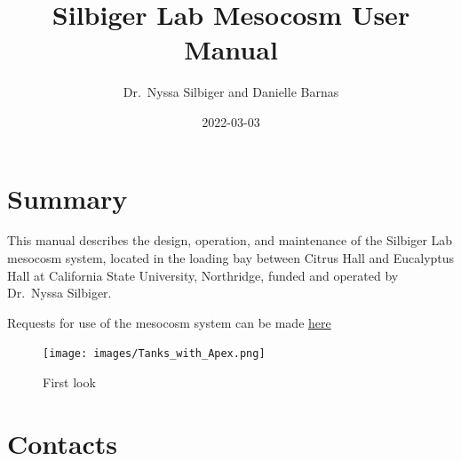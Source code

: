 \documentclass[
]{book}
\title{Silbiger Lab Mesocosm User Manual}
\author{Dr.~Nyssa Silbiger and Danielle Barnas}
\date{2022-03-03}
\begin{document}
\maketitle

{
\setcounter{tocdepth}{1}
\tableofcontents
}
\hypertarget{summary}{%
\chapter{Summary}\label{summary}}

This manual describes the design, operation, and maintenance of the Silbiger Lab mesocosm system, located in the loading bay between Citrus Hall and Eucalyptus Hall at California State University, Northridge, funded and operated by Dr.~Nyssa Silbiger.

Requests for use of the mesocosm system can be made \href{https://docs.google.com/forms/d/1LCZG39k8dJmIDLb5l6XBP8-Ow2yxawrKlUB2wUDesqg/edit}{here}

\begin{figure}
\centering
\texttt{[image: images/Tanks\_with\_Apex.png]}
\caption{First look}
\end{figure}

\hypertarget{contacts}{%
\chapter{Contacts}\label{contacts}}
\end{document}
